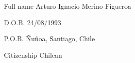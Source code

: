 \begin{cvskills}

  \cvskill
    {Full name} %
    {Arturo Ignacio Merino Figueroa} %

  \cvskill
    {D.O.B.} %
    {24/08/1993} %

\cvskill
{P.O.B.} %
{Ñuñoa, Santiago, Chile} %

  \cvskill
    {Citizenship} %
    {Chilean} %
    
\end{cvskills}
